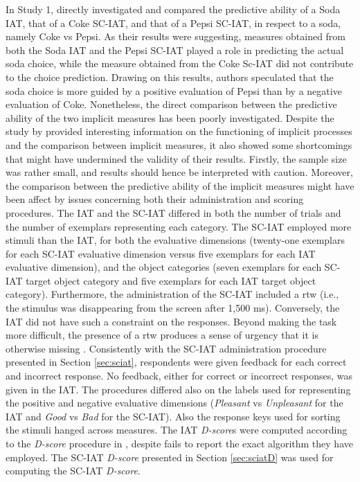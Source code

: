 \documentclass[12pt]{book}
\begin{document}
In Study 1, \cite{karpinski2006} directly investigated and compared the predictive ability of a Soda IAT, that of a Coke SC-IAT, and that of a Pepsi SC-IAT, in respect to a soda, namely Coke vs Pepsi. As their results were suggesting, measures obtained from both the Soda IAT and the Pepsi SC-IAT played  a role in predicting the actual soda choice, while the measure obtained from the Coke Sc-IAT did not contribute to the choice prediction. 
Drawing on this results, authors speculated that the soda choice is more guided by a positive evaluation of Pepsi than by a negative evaluation of Coke. Nonetheless, the direct comparison between the predictive ability of the two implicit measures has been poorly investigated. 
Despite the study by \cite{karpinski2006} provided interesting information on the functioning of implicit processes and the comparison between implicit measures, it also showed some shortcomings that might have undermined the validity of their results. Firstly, the sample size was rather small, and results should hence be interpreted with caution. Moreover, the comparison between the predictive ability of the implicit measures might have been affect by issues concerning both their administration and scoring procedures. The IAT and the SC-IAT differed in both the number of trials and the number of exemplars representing each category. The SC-IAT employed more stimuli than the IAT, for both the evaluative dimensions (twenty-one exemplars for each SC-IAT evaluative dimension versus five exemplars for each IAT evaluative dimension), and the object categories (seven exemplars for each SC-IAT target object category and five exemplars for each IAT target object category). Furthermore, the administration of the SC-IAT included a rtw (i.e., the stimulus was disappearing from the screen after 1,500 ms). Conversely, the IAT did not have such a constraint on the responses. Beyond making the task more difficult, the presence of a rtw produces a sense of urgency that it is otherwise missing \cite{karpinski2006}. Consistently with the SC-IAT administration procedure presented in Section \ref{sec:sciat}, respondents were given feedback for each correct and incorrect response. No feedback, either for correct or incorrect responses, was given in the IAT. The procedures differed also on the labels used for representing the positive and negative evaluative dimensions (\emph{Pleasant} vs \emph{Unpleasant} for the IAT and \emph{Good} vs \emph{Bad} for the SC-IAT). Also the response keys used for sorting the stimuli hanged across measures.  The IAT \emph{D-score}s were computed according to the \emph{D-score} procedure in , despite  fails to report the exact algorithm they have employed. The SC-IAT \emph{D-score} presented in Section \ref{sec:sciatD} was used for computing the SC-IAT \emph{D-score}.
\end{document}
